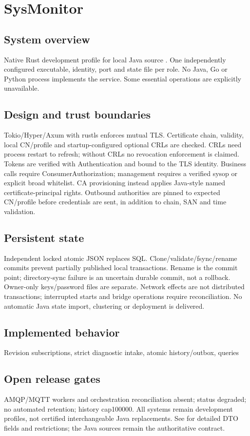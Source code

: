 \documentclass[a4paper]{arrowhead}
\begin{document}
\section{SysMonitor}
\subsection{System overview}
Native Rust development profile for local Java source . One independently configured executable, identity, port and state file per role. No Java, Go or Python process implements the service. Some essential operations are explicitly unavailable.
\subsection{Design and trust boundaries}
Tokio/Hyper/Axum with rustls enforces mutual TLS. Certificate chain, validity, local CN/profile and startup-configured optional CRLs are checked. CRLs need process restart to refresh; without CRLs no revocation enforcement is claimed. Tokens are verified with Authentication and bound to the TLS identity. Business calls require ConsumerAuthorization; management requires a verified sysop or explicit broad whitelist. CA provisioning instead applies Java-style named certificate-principal rights. Outbound authorities are pinned to expected CN/profile before credentials are sent, in addition to chain, SAN and time validation.
\subsection{Persistent state}
Independent locked atomic JSON replaces SQL. Clone/validate/fsync/rename commits prevent partially published local transactions. Rename is the commit point; directory-sync failure is an uncertain durable commit, not a rollback. Owner-only keys/password files are separate. Network effects are not distributed transactions; interrupted starts and bridge operations require reconciliation. No automatic Java state import, clustering or deployment is delivered.
\subsection{Implemented behavior}
Revision subscriptions, strict diagnostic intake, atomic history/outbox, queries
\subsection{Open release gates}
AMQP/MQTT workers and orchestration reconciliation absent; status degraded; no automated retention; history cap100000. All systems remain development profiles, not certified interchangeable Java replacements. See  for detailed DTO fields and restrictions; the Java sources remain the authoritative contract.
\end{document}
